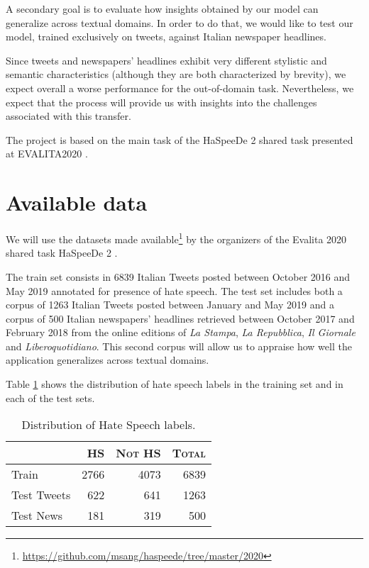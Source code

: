 \documentclass[a4paper, 10pt, twocolumn, DIV=calc]{scrartcl}
\begin{document}
A secondary goal is to evaluate how insights obtained by our model can generalize across textual domains. In order to do that, we would like to test our model, trained exclusively on tweets, against Italian newspaper headlines.

Since tweets and newspapers' headlines exhibit very different stylistic and semantic characteristics (although they are both characterized by brevity), we expect overall a worse performance for the out-of-domain task.
Nevertheless, we expect that the process will provide us with insights into the challenges associated with this transfer.

The project is based on the main task of the HaSpeeDe 2 shared task presented at EVALITA2020 \cite{haspeede2}.

\section{Available data}
We will use the datasets made available\footnote{\url{https://github.com/msang/haspeede/tree/master/2020}} by the organizers of the Evalita 2020 shared task HaSpeeDe 2 \cite{haspeede2}.

The train set consists in 6839 Italian Tweets posted between October 2016 and May 2019 annotated for presence of hate speech.
The test set includes both a corpus of 1263 Italian Tweets posted between January and May 2019 and a corpus of 500 Italian newspapers' headlines retrieved between October 2017 and February 2018 from the online editions of \emph{La Stampa}, \emph{La Repubblica}, \emph{Il Giornale} and \emph{Liberoquotidiano}.
This second corpus will allow us to appraise how well the application generalizes across textual domains.

Table \ref{tbl:class_composition} shows the distribution of hate speech labels in the training set and in each of the test sets.

\begin{table}
\caption{Distribution of Hate Speech labels.}
    \begin{tabular}{lrrr}
        \toprule
        & \textsc{HS} & \textsc{Not HS} & \textsc{Total} \\
        \midrule
        Train & 2766 & 4073 & 6839 \\
        \midrule
        Test Tweets & 622 & 641 & 1263 \\
        Test News & 181 & 319 & 500 \\
        \bottomrule
    \end{tabular}
    \label{tbl:class_composition}
\end{table}
\end{document}
